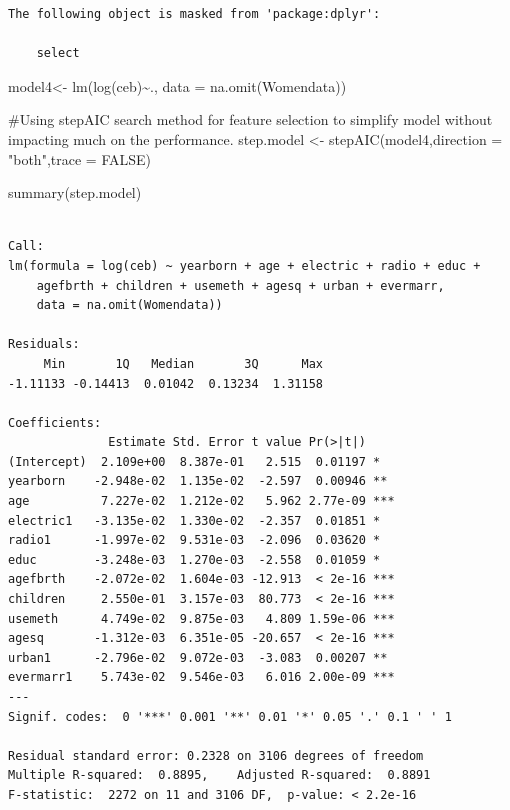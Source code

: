 \documentclass[
  letterpaper,
  DIV=11,
  numbers=noendperiod]{scrartcl}
\newenvironment{Shaded}{\begin{snugshade}}{\end{snugshade}}
\newcommand{\AttributeTok}[1]{\textcolor[rgb]{0.40,0.45,0.13}{#1}}
\newcommand{\CommentTok}[1]{\textcolor[rgb]{0.37,0.37,0.37}{#1}}
\newcommand{\ConstantTok}[1]{\textcolor[rgb]{0.56,0.35,0.01}{#1}}
\newcommand{\FunctionTok}[1]{\textcolor[rgb]{0.28,0.35,0.67}{#1}}
\newcommand{\NormalTok}[1]{\textcolor[rgb]{0.00,0.23,0.31}{#1}}
\newcommand{\OtherTok}[1]{\textcolor[rgb]{0.00,0.23,0.31}{#1}}
\newcommand{\SpecialCharTok}[1]{\textcolor[rgb]{0.37,0.37,0.37}{#1}}
\newcommand{\StringTok}[1]{\textcolor[rgb]{0.13,0.47,0.30}{#1}}
\begin{document}
\begin{verbatim}
The following object is masked from 'package:dplyr':

    select
\end{verbatim}

\begin{Shaded}
\begin{Highlighting}[]
\NormalTok{model4}\OtherTok{\textless{}{-}} \FunctionTok{lm}\NormalTok{(}\FunctionTok{log}\NormalTok{(ceb)}\SpecialCharTok{\textasciitilde{}}\NormalTok{., }
                \AttributeTok{data =} \FunctionTok{na.omit}\NormalTok{(Womendata))}

\CommentTok{\#Using stepAIC search method for feature selection to simplify model without impacting much on the performance.}
\NormalTok{step.model }\OtherTok{\textless{}{-}} \FunctionTok{stepAIC}\NormalTok{(model4,}\AttributeTok{direction =} \StringTok{"both"}\NormalTok{,}\AttributeTok{trace =} \ConstantTok{FALSE}\NormalTok{)}

\FunctionTok{summary}\NormalTok{(step.model)}
\end{Highlighting}
\end{Shaded}

\begin{verbatim}

Call:
lm(formula = log(ceb) ~ yearborn + age + electric + radio + educ + 
    agefbrth + children + usemeth + agesq + urban + evermarr, 
    data = na.omit(Womendata))

Residuals:
     Min       1Q   Median       3Q      Max 
-1.11133 -0.14413  0.01042  0.13234  1.31158 

Coefficients:
              Estimate Std. Error t value Pr(>|t|)    
(Intercept)  2.109e+00  8.387e-01   2.515  0.01197 *  
yearborn    -2.948e-02  1.135e-02  -2.597  0.00946 ** 
age          7.227e-02  1.212e-02   5.962 2.77e-09 ***
electric1   -3.135e-02  1.330e-02  -2.357  0.01851 *  
radio1      -1.997e-02  9.531e-03  -2.096  0.03620 *  
educ        -3.248e-03  1.270e-03  -2.558  0.01059 *  
agefbrth    -2.072e-02  1.604e-03 -12.913  < 2e-16 ***
children     2.550e-01  3.157e-03  80.773  < 2e-16 ***
usemeth      4.749e-02  9.875e-03   4.809 1.59e-06 ***
agesq       -1.312e-03  6.351e-05 -20.657  < 2e-16 ***
urban1      -2.796e-02  9.072e-03  -3.083  0.00207 ** 
evermarr1    5.743e-02  9.546e-03   6.016 2.00e-09 ***
---
Signif. codes:  0 '***' 0.001 '**' 0.01 '*' 0.05 '.' 0.1 ' ' 1

Residual standard error: 0.2328 on 3106 degrees of freedom
Multiple R-squared:  0.8895,    Adjusted R-squared:  0.8891 
F-statistic:  2272 on 11 and 3106 DF,  p-value: < 2.2e-16
\end{verbatim}
\end{document}
